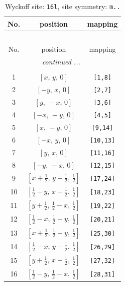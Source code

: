 \documentclass[fleqn,8pt]{jsarticle}
\begin{document}
\renewcommand{\arraystretch}{1.2}
\begin{longtable}{ccc}
\caption{Wyckoff site: {\tt 16l}, site symmetry: {\tt m..}}
 \\
 \hline \hline
No. & position & mapping \\ \hline \endfirsthead

\multicolumn{2}{l}{\tablename\ \thetable{}} \\
 \hline \hline
No. & position & mapping \\ \hline \endhead

 \hline \hline
\multicolumn{2}{r}{\footnotesize\it continued ...} \\ \endfoot

 \hline \hline
\multicolumn{2}{r}{} \\ \endlastfoot

1 & $\left[ x,\, y,\, 0 \right]$ & {\tt [1,8]} \\ \hline
2 & $\left[ - y,\, x,\, 0 \right]$ & {\tt [2,7]} \\ \hline
3 & $\left[ y,\, - x,\, 0 \right]$ & {\tt [3,6]} \\ \hline
4 & $\left[ - x,\, - y,\, 0 \right]$ & {\tt [4,5]} \\ \hline
5 & $\left[ x,\, - y,\, 0 \right]$ & {\tt [9,14]} \\ \hline
6 & $\left[ - x,\, y,\, 0 \right]$ & {\tt [10,13]} \\ \hline
7 & $\left[ y,\, x,\, 0 \right]$ & {\tt [11,16]} \\ \hline
8 & $\left[ - y,\, - x,\, 0 \right]$ & {\tt [12,15]} \\ \hline
9 & $\left[ x + \frac{1}{2},\, y + \frac{1}{2},\, \frac{1}{2} \right]$ & {\tt [17,24]} \\ \hline
10 & $\left[ \frac{1}{2} - y,\, x + \frac{1}{2},\, \frac{1}{2} \right]$ & {\tt [18,23]} \\ \hline
11 & $\left[ y + \frac{1}{2},\, \frac{1}{2} - x,\, \frac{1}{2} \right]$ & {\tt [19,22]} \\ \hline
12 & $\left[ \frac{1}{2} - x,\, \frac{1}{2} - y,\, \frac{1}{2} \right]$ & {\tt [20,21]} \\ \hline
13 & $\left[ x + \frac{1}{2},\, \frac{1}{2} - y,\, \frac{1}{2} \right]$ & {\tt [25,30]} \\ \hline
14 & $\left[ \frac{1}{2} - x,\, y + \frac{1}{2},\, \frac{1}{2} \right]$ & {\tt [26,29]} \\ \hline
15 & $\left[ y + \frac{1}{2},\, x + \frac{1}{2},\, \frac{1}{2} \right]$ & {\tt [27,32]} \\ \hline
16 & $\left[ \frac{1}{2} - y,\, \frac{1}{2} - x,\, \frac{1}{2} \right]$ & {\tt [28,31]} \\
\end{longtable}
\end{document}
